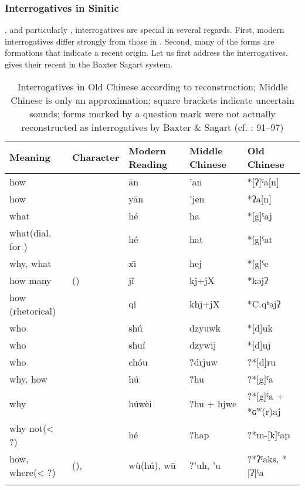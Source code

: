 \subsubsection{Interrogatives in Sinitic}\label{sec:5.9.3.1}

, and particularly , interrogatives are special in several regards. First, modern  interrogatives differ strongly from those in . Second, many of the forms are  formations that indicate a recent origin. Let us first address the  interrogatives.  gives their recent  in the Baxter Sagart system.

\begin{table}
\caption{Interrogatives in Old Chinese according to  reconstruction; Middle Chinese is only an approximation; square brackets indicate uncertain sounds; forms marked by a question mark were not actually reconstructed as interrogatives by Baxter \& Sagart (cf. \citealt{Pulleyblank1995}: 91--97)}
\label{tab:trans:4}

\begin{tabularx}{\textwidth}{Qllll}
\lsptoprule

\textbf{Meaning} & \textbf{Character} & \textbf{Modern Reading} & \textbf{Middle Chinese} & \textbf{Old Chinese}\\
\midrule
how &  & ān & 'an & *[ʔ]ˤa[n]\\
how &  & yān & 'jen & *ʔa[n]\\
what &  & hé & ha & *[g]ˤaj\\
what\newline (dial. for ) &  & hé & hat & *[g]ˤat\\
why, what &  & x\={\i} & hej & *[g]ˤe\\
how many &  () & jǐ & kj+jX & *kəjʔ\\
how (rhetorical) &  & qǐ & khj+jX & *C.qʰəjʔ\\
who &  & shú & dzyuwk & *[d]uk\\
who &  & shuí & dzywij & *[d]uj\\
who &  & chóu & ?drjuw & ?*[d]ru\\
why, how &  & hú & ?hu & ?*[g]ˤa\\
why &  & húwèi & ?hu + hjwe & ?*[g]ˤa + *ɢ\textsuperscript{w}(r)aj\\
why not\newline (< ?) &  & hé & ?hap & ?*m-[k]ˤap\\
how, where\newline (< ?) & (),  & wù(hú), w\=u & ?'uh, 'u & ?*ʔˤaks, *[ʔ]ˤa\\
\lspbottomrule
\end{tabularx}
\end{table}

